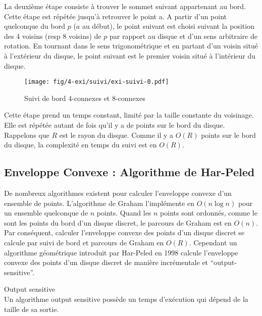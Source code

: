 La deuxième étape consiste à trouver le sommet suivant appartenant au bord. Cette étape est répétée jusqu'à retrouver le point a. A partir d'un point quelconque du bord $p$ ($a$ au début), le point suivant est choisi suivant la position des 4 voisins (resp 8 voisins) de $p$ par rapport au disque et d'un sens arbitraire de rotation. En tournant dans le sens trigonométrique et en partant d'un voisin situé à l'extérieur du disque, le point suivant est le premier voisin situé à l'intérieur du disque. 

\begin{figure}[H]
  \centering
  \texttt{[image: fig/4-exi/suivi/exi-suivi-0.pdf]}
  \caption{Suivi de bord 4-connexes et 8-connexes}
\end{figure}
  
Cette étape prend un temps constant, limité par la taille constante du voisinage. Elle est répétée autant de fois qu'il y a de points sur le bord du disque. Rappelons que $R$ est le rayon du disque. Comme il y a $O(R)$ points sur le bord du disque, la complexité en temps du suivi est en $O(R)$. 

\subsection{Enveloppe Convexe : Algorithme de Har-Peled}

De nombreux algorithmes existent pour calculer l'enveloppe convexe d'un ensemble de points. L'algorithme de Graham \cite{Graham1972} l'implémente en $O(n \log n)$ pour un ensemble quelconque de $n$ points. Quand les $n$ points sont ordonnés, comme le sont les points du bord d'un disque discret, le parcours de Graham est en $O(n)$. Par conséquent, calculer l'enveloppe convexe des points d'un disque discret se calcule par suivi de bord et parcours de Graham en $O(R)$. Cependant un algorithme géométrique introduit par Har-Peled en 1998 \cite{HarPeled98} calcule l'enveloppe convexe des points d'un disque discret de manière incrémentale et ``output-sensitive''.

\begin{Definition}{Output sensitive}\\
\label{def:os}
      Un algorithme output sensitive possède un temps d’exécution qui dépend de la taille de sa sortie.
\end{Definition}

